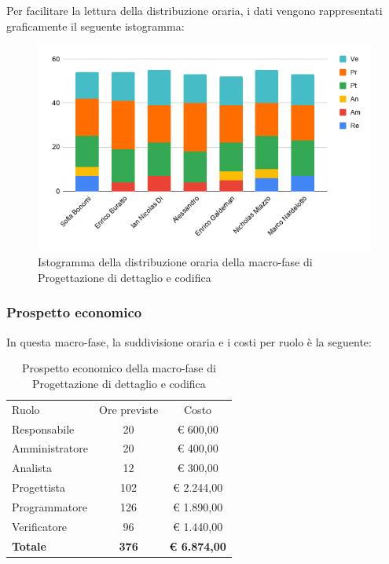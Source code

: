 \documentclass[../piano-di-progetto.tex]{subfiles}
\begin{document}
  Per facilitare la lettura della distribuzione oraria, i dati vengono rappresentati graficamente il seguente istogramma:
  \begin{figure}[H]
    \centering
    \includegraphics[width=12cm]{img/ore-codifica.png}
    \caption{Istogramma della distribuzione oraria della macro-fase di Progettazione di dettaglio e codifica}
    \label{fig:ore-componente-codifica}
  \end{figure}

  \subsubsection{Prospetto economico}
  In questa macro-fase, la suddivisione oraria e i costi per ruolo è la seguente:

  \begin{table}[H]
    \centering
    \begin{tabular}{lcc}
      Ruolo           & Ore previste & Costo               \\
      Responsabile    & 20           & € 600,00            \\
      Amministratore  & 20           & € 400,00            \\
      Analista        & 12           & € 300,00            \\
      Progettista     & 102          & € 2.244,00          \\
      Programmatore   & 126          & € 1.890,00          \\
      Verificatore    & 96           & € 1.440,00          \\
      \textbf{Totale} & \textbf{376} & \textbf{€ 6.874,00}
    \end{tabular}
    \caption{Prospetto economico della macro-fase di Progettazione di dettaglio e codifica}
  \end{table}
\end{document}
